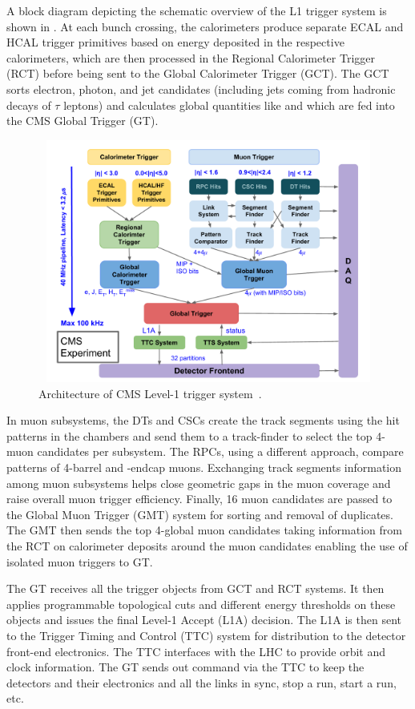 A block diagram depicting the schematic overview of the L1 trigger system is shown in \fig{\ref{fig:L1trigger}}.
At each bunch crossing, the calorimeters produce separate ECAL and HCAL trigger primitives based on energy deposited in the respective calorimeters,
which are then processed in the Regional Calorimeter Trigger (\gls{RCT}) before being sent to the Global Calorimeter Trigger (\gls{GCT}). The GCT sorts electron, 
photon, and jet candidates (including jets coming from hadronic decays of $\tau$ leptons) and calculates global quantities like \met and \HT which
are fed into the CMS Global Trigger (\gls{GT}).
\begin{figure}[h]
\centering
\includegraphics[width=14cm,height=8cm]{ch2/figures/L1Trigger_BlockDiag.pdf}
\caption{Architecture of CMS Level-1 trigger system~\cite{triggerTDR}.}
\label{fig:L1trigger}
\end{figure}
In muon subsystems, the DTs and CSCs create the track segments using the hit patterns in the chambers and send them to a track-finder to select 
the top 4-muon  candidates per subsystem. The RPCs, using a different approach, compare patterns of 4-barrel and -endcap muons. Exchanging track 
segments information among muon subsystems helps close geometric gaps in the muon coverage and raise overall muon trigger efficiency. Finally, 16 
muon candidates are passed to the Global Muon Trigger (\gls{GMT}) system for sorting and removal of duplicates. The GMT then sends the top 4-global 
muon candidates taking information from the RCT on calorimeter deposits around the muon candidates enabling the use of isolated muon triggers to GT. 

The GT receives all the trigger objects from GCT and RCT systems. It then applies programmable topological cuts and different energy thresholds on 
these objects and issues the final Level-1 Accept (L1A) decision. The L1A is then sent to the Trigger Timing and Control (\gls{TTC}) system for distribution 
to the detector front-end electronics. The TTC interfaces with the LHC to provide orbit and clock information. The GT sends out command via the TTC to 
keep the detectors and their electronics and all the links in sync, stop a run, start a run, etc. 

